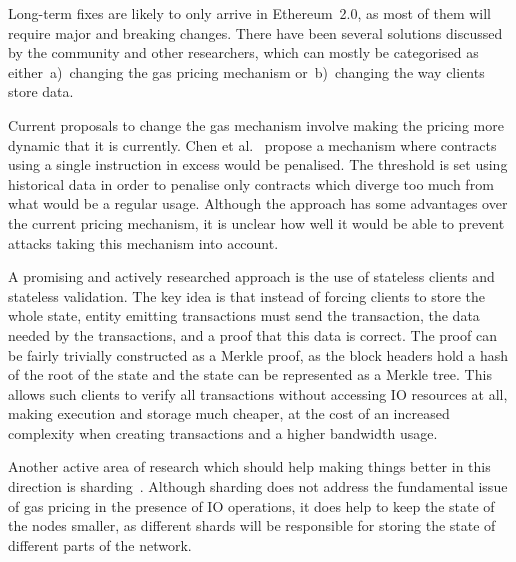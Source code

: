 Long-term fixes are likely to only arrive in Ethereum~2.0, as most of them will require major and breaking changes. There have been several solutions discussed by the community and other researchers, which can mostly be categorised as either~a)~changing the gas pricing mechanism or~b)~changing the way clients store data.

Current proposals to change the gas mechanism involve making the pricing more dynamic that it is currently. Chen et al.~\cite{Chen2017Metering} propose a mechanism where contracts using a single instruction in excess would be penalised. The threshold is set using historical data in order to penalise only contracts which diverge too much from what would be a regular usage. Although the approach has some advantages over the current pricing mechanism, it is unclear how well it would be able to prevent attacks taking this mechanism into account.

A promising and actively researched approach is the use of stateless clients and stateless validation. The key idea is that instead of forcing clients to store the whole state, entity emitting transactions must send the transaction, the data needed by the transactions, and a proof that this data is correct. The proof can be fairly trivially constructed as a Merkle proof, as the block headers hold a hash of the root of the state and the state can be represented as a Merkle tree. This allows such clients to verify all transactions without accessing IO resources at all, making execution and storage much cheaper, at the cost of an increased complexity when creating transactions and a higher bandwidth usage.

Another active area of research which should help making things better in this direction is sharding~\cite{al2017chainspace}. Although sharding does not address the fundamental issue of gas pricing in the presence of IO operations, it does help to keep the state of the nodes smaller, as different shards will be responsible for storing the state of different parts of the network.
